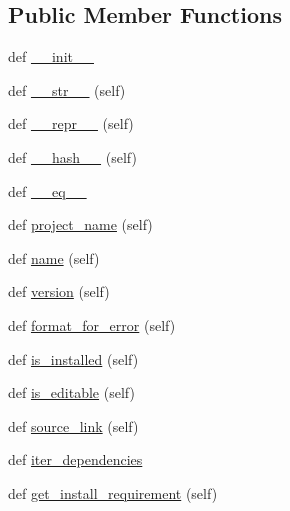 \subsection*{Public Member Functions}
\begin{DoxyCompactItemize}
\item 
def \hyperlink{classpip_1_1__internal_1_1resolution_1_1resolvelib_1_1candidates_1_1ExtrasCandidate_a452ac3f68285d626f92c0220ef0d005a}{\+\_\+\+\_\+init\+\_\+\+\_\+}
\item 
def \hyperlink{classpip_1_1__internal_1_1resolution_1_1resolvelib_1_1candidates_1_1ExtrasCandidate_a7f262c9b10b84386c931c9e8c481fe25}{\+\_\+\+\_\+str\+\_\+\+\_\+} (self)
\item 
def \hyperlink{classpip_1_1__internal_1_1resolution_1_1resolvelib_1_1candidates_1_1ExtrasCandidate_a76401d9a7c6df2f6538a36eb398101a6}{\+\_\+\+\_\+repr\+\_\+\+\_\+} (self)
\item 
def \hyperlink{classpip_1_1__internal_1_1resolution_1_1resolvelib_1_1candidates_1_1ExtrasCandidate_a1f4f61ab73c8b3836b9cc8115fe228f3}{\+\_\+\+\_\+hash\+\_\+\+\_\+} (self)
\item 
def \hyperlink{classpip_1_1__internal_1_1resolution_1_1resolvelib_1_1candidates_1_1ExtrasCandidate_abda015b9ddd270623b7d2d08224f9010}{\+\_\+\+\_\+eq\+\_\+\+\_\+}
\item 
def \hyperlink{classpip_1_1__internal_1_1resolution_1_1resolvelib_1_1candidates_1_1ExtrasCandidate_a5a650992814f9ee972a9a8bca2534b56}{project\+\_\+name} (self)
\item 
def \hyperlink{classpip_1_1__internal_1_1resolution_1_1resolvelib_1_1candidates_1_1ExtrasCandidate_ab104c8ed5e2140f11c0fb3710df3d894}{name} (self)
\item 
def \hyperlink{classpip_1_1__internal_1_1resolution_1_1resolvelib_1_1candidates_1_1ExtrasCandidate_a022f947eaaa0ed18ed6dc2d295117d01}{version} (self)
\item 
def \hyperlink{classpip_1_1__internal_1_1resolution_1_1resolvelib_1_1candidates_1_1ExtrasCandidate_a508343be17f8013a25ab77765ab41e4b}{format\+\_\+for\+\_\+error} (self)
\item 
def \hyperlink{classpip_1_1__internal_1_1resolution_1_1resolvelib_1_1candidates_1_1ExtrasCandidate_a3a841705b6f38fe26e6c6a99a478164f}{is\+\_\+installed} (self)
\item 
def \hyperlink{classpip_1_1__internal_1_1resolution_1_1resolvelib_1_1candidates_1_1ExtrasCandidate_a80ac08714863513996cb338470c97e99}{is\+\_\+editable} (self)
\item 
def \hyperlink{classpip_1_1__internal_1_1resolution_1_1resolvelib_1_1candidates_1_1ExtrasCandidate_a45a2ba2ddcbad32bc8a1abf6dfb0498f}{source\+\_\+link} (self)
\item 
def \hyperlink{classpip_1_1__internal_1_1resolution_1_1resolvelib_1_1candidates_1_1ExtrasCandidate_aaebe369fdd4f5fad72e126ad995d36ac}{iter\+\_\+dependencies}
\item 
def \hyperlink{classpip_1_1__internal_1_1resolution_1_1resolvelib_1_1candidates_1_1ExtrasCandidate_acdd8b81cbb2ff4dc3dad1404dcc9e74e}{get\+\_\+install\+\_\+requirement} (self)
\end{DoxyCompactItemize}
